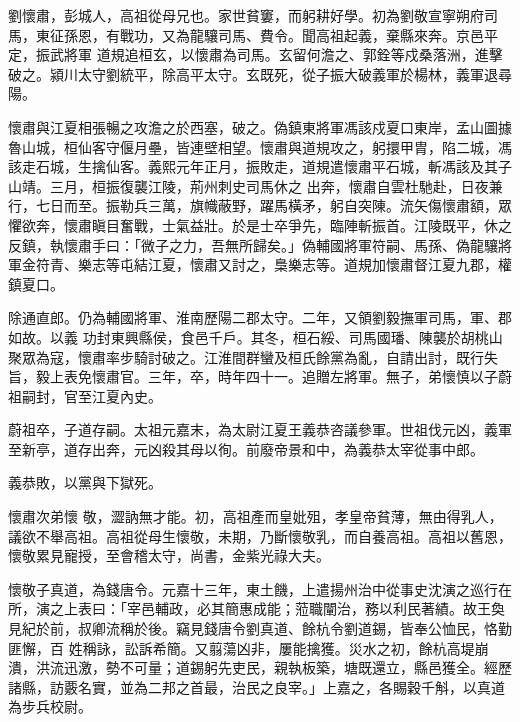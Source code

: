 
\begin{pinyinscope}

 劉懷肅，彭城人，高祖從母兄也。家世貧窶，而躬耕好學。初為劉敬宣寧朔府司馬，東征孫恩，有戰功，又為龍驤司馬、費令。聞高祖起義，棄縣來奔。京邑平定，振武將軍
 道規追桓玄，以懷肅為司馬。玄留何澹之、郭銓等戍桑落洲，進擊破之。潁川太守劉統平，除高平太守。玄既死，從子振大破義軍於楊林，義軍退尋陽。



 懷肅與江夏相張暢之攻澹之於西塞，破之。偽鎮東將軍馮該戍夏口東岸，孟山圖據魯山城，桓仙客守偃月壘，皆連壁相望。懷肅與道規攻之，躬擐甲胄，陷二城，馮該走石城，生擒仙客。義熙元年正月，振敗走，道規遣懷肅平石城，斬馮該及其子山靖。三月，桓振復襲江陵，荊州刺史司馬休之
 出奔，懷肅自雲杜馳赴，日夜兼行，七日而至。振勒兵三萬，旗幟蔽野，躍馬橫矛，躬自突陳。流矢傷懷肅額，眾懼欲奔，懷肅瞋目奮戰，士氣益壯。於是士卒爭先，臨陣斬振首。江陵既平，休之反鎮，執懷肅手曰：「微子之力，吾無所歸矣。」偽輔國將軍符嗣、馬孫、偽龍驤將軍金符青、樂志等屯結江夏，懷肅又討之，梟樂志等。道規加懷肅督江夏九郡，權鎮夏口。



 除通直郎。仍為輔國將軍、淮南歷陽二郡太守。二年，又領劉毅撫軍司馬，軍、郡如故。以義
 功封東興縣侯，食邑千戶。其冬，桓石綏、司馬國璠、陳襲於胡桃山聚眾為寇，懷肅率步騎討破之。江淮間群蠻及桓氏餘黨為亂，自請出討，既行失旨，毅上表免懷肅官。三年，卒，時年四十一。追贈左將軍。無子，弟懷慎以子蔚祖嗣封，官至江夏內史。



 蔚祖卒，子道存嗣。太祖元嘉末，為太尉江夏王義恭咨議參軍。世祖伐元凶，義軍至新亭，道存出奔，元凶殺其母以徇。前廢帝景和中，為義恭太宰從事中郎。



 義恭敗，以黨與下獄死。



 懷肅次弟懷
 敬，澀訥無才能。初，高祖產而皇妣殂，孝皇帝貧薄，無由得乳人，議欲不舉高祖。高祖從母生懷敬，未期，乃斷懷敬乳，而自養高祖。高祖以舊恩，懷敬累見寵授，至會稽太守，尚書，金紫光祿大夫。



 懷敬子真道，為錢唐令。元嘉十三年，東土饑，上遣揚州治中從事史沈演之巡行在所，演之上表曰：「宰邑輔政，必其簡惠成能；蒞職闡治，務以利民著績。故王奐見紀於前，叔卿流稱於後。竊見錢唐令劉真道、餘杭令劉道錫，皆奉公恤民，恪勤匪懈，百
 姓稱詠，訟訴希簡。又翦蕩凶非，屢能擒獲。災水之初，餘杭高堤崩潰，洪流迅激，勢不可量；道錫躬先吏民，親執板築，塘既還立，縣邑獲全。經歷諸縣，訪覈名實，並為二邦之首最，治民之良宰。」上嘉之，各賜穀千斛，以真道為步兵校尉。




\end{pinyinscope}
